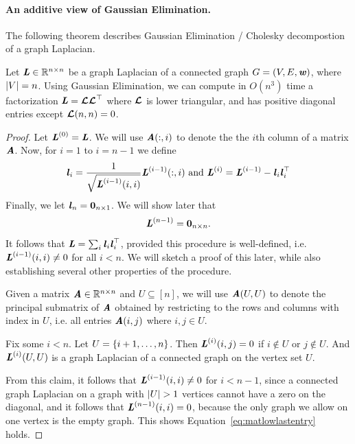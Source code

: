 \paragraph{An additive view of Gaussian Elimination.}
The following theorem describes Gaussian Elimination / Cholesky
decompostion of a graph Laplacian.
\begin{theorem}
 Let $\LL
 \in \R^{n \times n}$ be a graph Laplacian of a connected
 graph $G = (V,E,\ww)$, where
$\abs{V} = n$.
 Using Gaussian Elimination, we can compute in $O(n^3)$ time a
 factorization $\LL = \matlow\matlow^{\trp}$ where $\matlow$ is lower
 triangular, and has positive diagonal entries except $\matlow(n,n) = 0$.
\end{theorem}
\begin{proof}
  Let $\LL^{(0)} = \LL$.
We will use $\AA(:,i)$ to denote the the $i$th column of a matrix $\AA$.
Now, for $i = 1$ to $i = n-1$ we define
\[
  \ll_i = \frac{1}{\sqrt{\LL^{(i-1)}(i,i)}} \LL^{(i-1)}(:,i)
  \text{ and }
   \LL^{(i)}  = \LL^{(i-1)} - \ll_i \ll_i^{\trp}
 \]
 Finally, we let $\ll_n = \veczero_{n \times 1}$.
 We will show later that
 \begin{equation}
   \label{eq:matlowlastentry}
   \LL^{(n-1)} = \matzero_{n \times n}.
 \end{equation}
 It follows that $\LL = \sum_{i} \ll_i \ll_i^{\trp}$, provided this
 procedure is well-defined, i.e. $\LL^{(i-1)}(i,i) \neq 0$ for all $i
< n$. We will sketch a proof of this later, while also establishing
several other properties of the procedure.

Given a matrix $\AA \in \R^{n \times n}$ and $U \subseteq [n]$, we will use $\AA(U, U)$ to
denote the principal submatrix of $\AA$ obtained by restricting to the
rows and columns with index in $U$, i.e. all entries $\AA(i,j)$ where
$i,j \in U$.
\begin{claim}
  \label{clm:schurconnected}
  Fix some $i < n$.
  Let $U = \setof{i+1,\ldots,n}$.
  Then $\LL^{(i)}(i,j) = 0$ if $i \not\in U$ or $j \not\in U$.
  And $\LL^{(i)}(U, U)$ is a graph Laplacian of a connected graph on
  the vertex set $U$.
\end{claim}
From this claim, it follows that $\LL^{(i-1)}(i,i) \neq 0$ for $i<n-1$,
since a connected graph Laplacian on a graph with $\abs{U} > 1$
vertices cannot have a zero on the diagonal, and it follows that
$\LL^{(n-1)}(i,i) = 0$, because the only graph we allow on one vertex
is the empty graph. This shows Equation~\eqref{eq:matlowlastentry} holds.
\end{proof}

